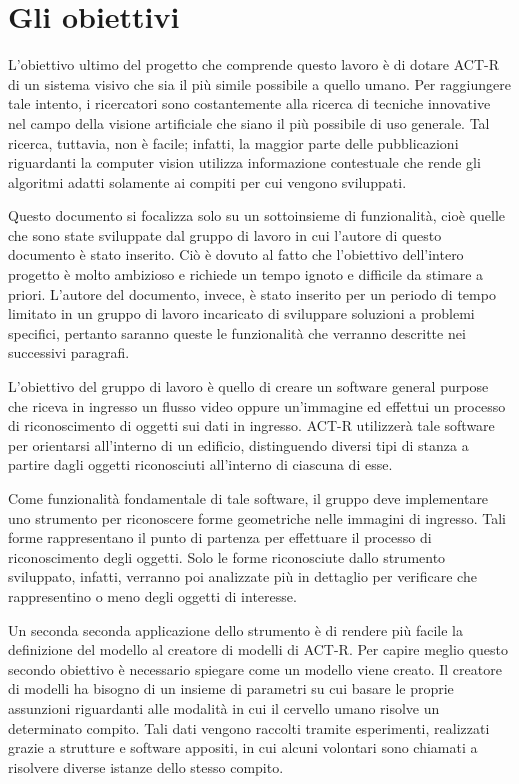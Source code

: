 	\section*{Gli obiettivi}
		L'obiettivo ultimo del progetto che comprende questo lavoro è di dotare \mbox{ACT-R} di un sistema visivo che sia il più simile possibile a quello umano.
		Per raggiungere tale intento, i ricercatori sono costantemente alla ricerca di tecniche innovative nel campo della visione artificiale che siano il più possibile di uso generale.
		Tal ricerca, tuttavia, non è facile; infatti, la maggior parte delle pubblicazioni riguardanti la computer vision utilizza informazione contestuale che rende gli algoritmi adatti solamente ai compiti per cui vengono sviluppati.
		
		Questo documento si focalizza solo su un sottoinsieme di funzionalità, cioè quelle che sono state sviluppate dal gruppo di lavoro in cui l'autore di questo documento è stato inserito.	
		Ciò è dovuto al fatto che l'obiettivo dell'intero progetto è molto ambizioso e richiede un tempo ignoto e difficile da stimare a priori. 
		L'autore del documento, invece, è stato inserito per un periodo di tempo limitato in un gruppo di lavoro incaricato di sviluppare soluzioni a problemi specifici, pertanto saranno queste le funzionalità che verranno descritte nei successivi paragrafi.

		L'obiettivo del gruppo di lavoro è quello di creare un software general purpose che riceva in ingresso un flusso video oppure un'immagine ed effettui un processo di riconoscimento di oggetti sui dati in ingresso.
		\mbox{ACT-R} utilizzerà tale software per orientarsi all'interno di un edificio, distinguendo diversi tipi di stanza a partire dagli oggetti riconosciuti all'interno di ciascuna di esse.

		Come funzionalità fondamentale di tale software, il gruppo deve implementare uno strumento per riconoscere forme geometriche nelle immagini di ingresso. 
		Tali forme rappresentano il punto di partenza per effettuare il processo di riconoscimento degli oggetti. 
		Solo le forme riconosciute dallo strumento sviluppato, infatti, verranno poi analizzate più in dettaglio per verificare che rappresentino o meno degli oggetti di interesse.

		Un seconda seconda applicazione dello strumento è di rendere più facile la definizione del modello al creatore di modelli di \mbox{ACT-R}.
		Per capire meglio questo secondo obiettivo è necessario spiegare come un modello viene creato.
		Il creatore di modelli ha bisogno di un insieme di parametri su cui basare le proprie assunzioni riguardanti alle modalità in cui il cervello umano risolve un determinato compito.
		Tali dati vengono raccolti tramite esperimenti, realizzati grazie a strutture e software appositi, in cui alcuni volontari sono chiamati a risolvere diverse istanze dello stesso compito.
		
